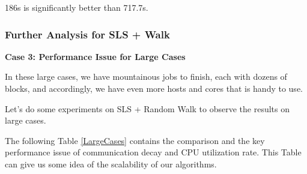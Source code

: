 \documentclass{article}
\begin{document}
    186s is significantly better than 717.7s.
    
\subsubsection{Further Analysis for SLS + Walk}
    \textbf{Case 3: Performance Issue for Large Cases}
    
    In these large cases, we have mountainous jobs to finish, each with dozens of blocks, and accordingly, we have even more hosts and cores that is handy to use.
    
    Let's do some experiments on SLS + Random Walk to observe the results on large cases.
    
    The following Table \ref{LargeCases} contains the comparison and the key performance issue of communication decay and CPU utilization rate. This Table can give us some idea of the scalability of our algorithms.
    
\end{document}
